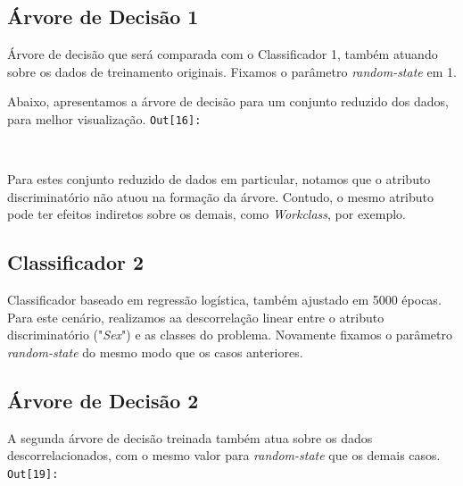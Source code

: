 \documentclass[11pt]{article}
\begin{document}
    \subsection{Árvore de Decisão 1}\label{uxe1rvore-de-decisuxe3o-1}

Árvore de decisão que será comparada com o Classificador 1, também
atuando sobre os dados de treinamento originais. Fixamos o parâmetro
\emph{random-state} em 1.

    Abaixo, apresentamos a árvore de decisão para um conjunto reduzido dos
dados, para melhor visualização.
\texttt{\color{outcolor}Out[{\color{outcolor}16}]:}
    
    \begin{center}
    \end{center}
    { \hspace*{\fill} \\}
    

    Para estes conjunto reduzido de dados em particular, notamos que o
atributo discriminatório não atuou na formação da árvore. Contudo, o
mesmo atributo pode ter efeitos indiretos sobre os demais, como
\emph{Workclass}, por exemplo.

    \subsection{Classificador 2}\label{classificador-2}

Classificador baseado em regressão logística, também ajustado em 5000
épocas. Para este cenário, realizamos aa descorrelação linear entre o
atributo discriminatório ("\emph{Sex}") e as classes do problema.
Novamente fixamos o parâmetro \emph{random-state} do mesmo modo que os
casos anteriores.

    \subsection{Árvore de Decisão 2}\label{uxe1rvore-de-decisuxe3o-2}

A segunda árvore de decisão treinada também atua sobre os dados
descorrelacionados, com o mesmo valor para \emph{random-state} que os
demais casos.
\texttt{\color{outcolor}Out[{\color{outcolor}19}]:}
    
    \begin{center}
    \end{center}
    { \hspace*{\fill} \\}
    
\end{document}
